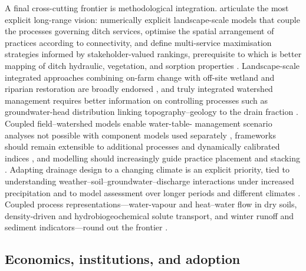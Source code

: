 A final cross-cutting frontier is methodological integration.
\textcite{Dollinger2015} articulate the most explicit long-range vision:
numerically explicit landscape-scale models that couple the processes governing
ditch services, optimise the spatial arrangement of practices according to
connectivity, and define multi-service maximisation strategies informed by
stakeholder-valued rankings, prerequisite to which is better mapping of ditch
hydraulic, vegetation, and sorption properties \parencite{Dollinger2015,Herzon2008}.
Landscape-scale integrated approaches combining on-farm change with off-site
wetland and riparian restoration are broadly endorsed
\parencite{Blann2009,Goeller2019}, and truly integrated watershed management
requires better information on controlling processes such as
groundwater-head distribution linking topography--geology to the drain fraction
\parencite{Mahmood2023}. Coupled field--watershed models enable water-table-
management scenario analyses not possible with component models used separately
\parencite{Dayyani2010}, frameworks should remain extensible to additional
processes and dynamically calibrated indices \parencite{Basu2010,Tao2025,Verma2014},
and modelling should increasingly guide practice placement and stacking
\parencite{Kröger2013,Tomer2015,Lemke2011,McDowell2021,King2022,Roley2016}.
Adapting drainage design to a changing climate is an explicit priority, tied to
understanding weather--soil--groundwater--discharge interactions under increased
precipitation and to model assessment over longer periods and different climates
\parencite{Deelstra2015,Tuohy2018,Malota2024,Deelstra2014,Deelstra2014b}. Coupled
process representations---water-vapour and heat--water flow in dry soils,
density-driven and hydrobiogeochemical solute transport, and winter runoff and
sediment indicators---round out the frontier
\parencite{Moroizumi2004,Koivusalo1999,Salo2015,Varvaris2018,Augeard2005}.

\subsection{Economics, institutions, and adoption}

